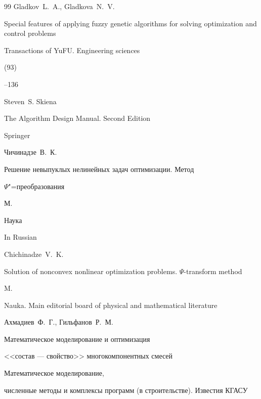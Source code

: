 \begin{thebibliography}{99}
\by Gladkov~L.~A., Gladkova~N.~V.

\paper Special features of applying fuzzy genetic algorithms for solving optimization and control problems

\jour Transactions of YuFU. Engineering sciences


(93)

--136






\by Steven~S. Skiena

\book The Algorithm Design Manual. Second Edition

\publaddr Springer






\by  Чичинадзе~В.~К.

\book Решение невыпуклых нелинейных задач оптимизации. Метод

$\Psi$"=преобразования

\publaddr М.

\publ Наука



\misctransl

\lang In Russian

\by Chichinadze~V.~K.

\book Solution of nonconvex nonlinear optimization problems. $\Psi$-transform method

\publaddr M.

\publ Nauka. Main editorial board of physical and mathematical literature








\by Ахмадиев~Ф.~Г., Гильфанов~Р.~М.

\paper Математическое моделирование и оптимизация

<<состав --- свойство>> многокомпонентных смесей

\jour Математическое моделирование,

численные методы и комплексы программ (в строительстве). Известия КГАСУ


\end{thebibliography}
